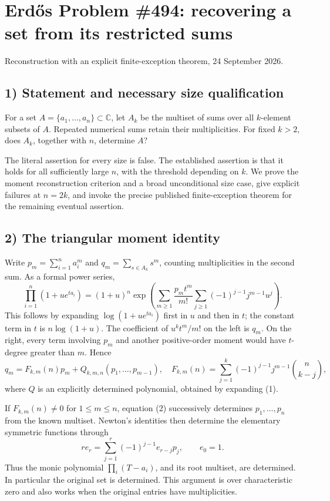 \section{Erd\H{o}s Problem \#494: recovering a set from its restricted sums}
\noindent Reconstruction with an explicit finite-exception theorem, 24 September 2026.

\subsection*{1) Statement and necessary size qualification}
For a set $A=\{a_1,\ldots,a_n\}\subset\mathbb C$, let $A_k$ be the multiset of sums over all $k$-element subsets of $A$. Repeated numerical sums retain their multiplicities. For fixed $k>2$, does $A_k$, together with $n$, determine $A$?

The literal assertion for every size is false. The established assertion is that it holds for all sufficiently large $n$, with the threshold depending on $k$. We prove the moment reconstruction criterion and a broad unconditional size case, give explicit failures at $n=2k$, and invoke the precise published finite-exception theorem for the remaining eventual assertion.

\subsection*{2) The triangular moment identity}
Write $p_m=\sum_{i=1}^n a_i^m$ and $q_m=\sum_{s\in A_k}s^m$, counting multiplicities in the second sum. As a formal power series,
\[
\prod_{i=1}^n(1+u e^{ta_i})
=(1+u)^n\exp\left(\sum_{m\ge1}\frac{p_m t^m}{m!}
\sum_{j\ge1}(-1)^{j-1}j^{m-1}u^j\right).\tag{1}
\]
This follows by expanding $\log(1+u e^{ta_i})$ first in $u$ and then in $t$; the constant term in $t$ is $n\log(1+u)$. The coefficient of $u^k t^m/m!$ on the left is $q_m$. On the right, every term involving $p_m$ and another positive-order moment would have $t$-degree greater than $m$. Hence
\[
q_m=F_{k,m}(n)p_m+Q_{k,m,n}(p_1,\ldots,p_{m-1}),
\quad
F_{k,m}(n)=\sum_{j=1}^k(-1)^{j-1}j^{m-1}\binom n{k-j},\tag{2}
\]
where $Q$ is an explicitly determined polynomial, obtained by expanding (1).

If $F_{k,m}(n)\ne0$ for $1\le m\le n$, equation (2) successively determines $p_1,\ldots,p_n$ from the known multiset. Newton's identities then determine the elementary symmetric functions through
\[r e_r=\sum_{j=1}^r(-1)^{j-1}e_{r-j}p_j,\qquad e_0=1.\]
Thus the monic polynomial $\prod_i(T-a_i)$, and its root multiset, are determined. In particular the original set is determined. This argument is over characteristic zero and also works when the original entries have multiplicities.

